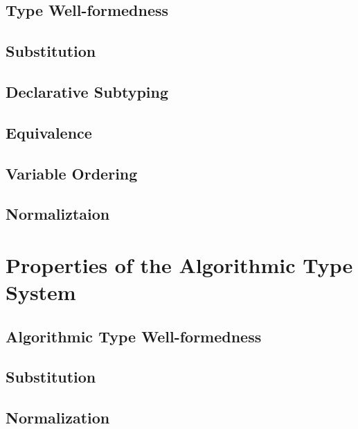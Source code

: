 \documentclass[acmsmall,natbib=false,review,anonymous]{acmart}
\newcommand{\genDir}{_gen}
\begin{document}
\subsection{Type Well-formedness}


\subsection{Substitution}


\subsection{Declarative Subtyping}


\subsection{Equivalence}
\label{sec:decl-equiv-lemmas}


\subsection{Variable Ordering}



\subsection{Normaliztaion}



\section{Properties of the Algorithmic Type System}

\subsection{Algorithmic Type Well-formedness}


\subsection{Substitution}


\subsection{Normalization}

\end{document}
